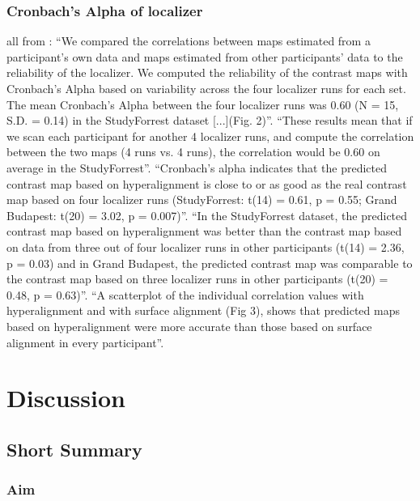 \subsubsection{Cronbach's Alpha of localizer}


all from \citep{jiahui2020predicting}: ``We compared the correlations between
maps estimated from a participant's own data and maps estimated from other
participants' data to the reliability of the localizer. We computed the
reliability of the contrast maps with Cronbach's Alpha based on variability
across the four localizer runs for each set. The mean Cronbach's Alpha between
the four localizer runs was 0.60 (N = 15, S.D. = 0.14) in the StudyForrest
dataset [...](Fig. 2)''.
%
``These results mean that if we scan each participant for another 4 localizer
runs, and compute the correlation between the two maps (4 runs vs. 4 runs), the
correlation would be 0.60 on average in the StudyForrest''.
%
``Cronbach's alpha indicates that the predicted contrast map based on
hyperalignment is close to or as good as the real contrast map based on four
localizer runs (StudyForrest: t(14) = 0.61, p = 0.55; Grand Budapest: t(20) =
3.02, p = 0.007)''.
%
``In the StudyForrest dataset, the predicted contrast map based on
hyperalignment was better than the contrast map based on data from three out of
four localizer runs in other participants (t(14) = 2.36, p = 0.03) and in Grand
Budapest, the predicted contrast map was comparable to the contrast map based on
three localizer runs in other participants (t(20) = 0.48, p = 0.63)''.
%
``A scatterplot of the individual correlation values with hyperalignment and
with surface alignment (Fig 3), shows that predicted maps based on
hyperalignment were more accurate than those based on surface alignment in every
participant''.


\section{Discussion}


\subsection{Short Summary}

\subsubsection{Aim}

